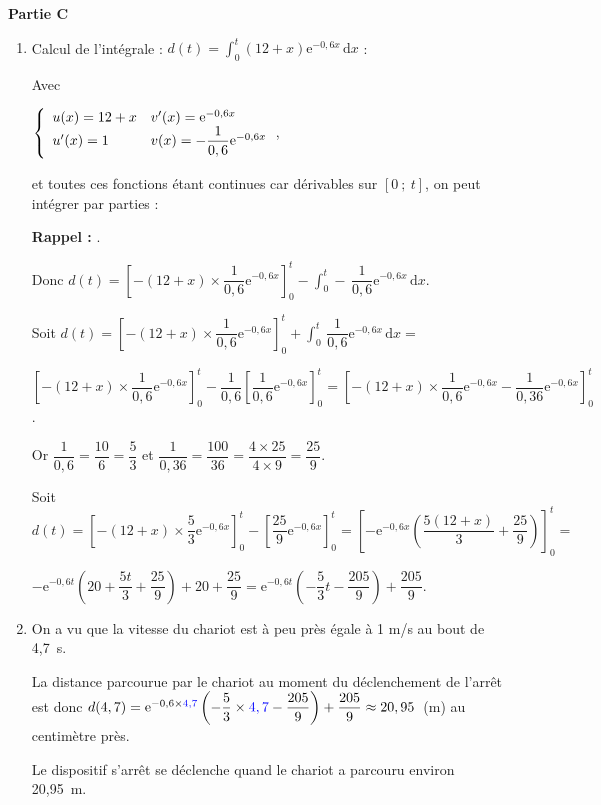 \documentclass[10pt]{article}
\providecommand{\blue}{\color{blue}}
\providecommand{\e}{{\mathrm{e}}}
\providecommand{\blue}{\color{blue}}
\begin{document}
\begin{center}\textbf{Partie C} \end{center}

\begin{enumerate}
\item Calcul de l'intégrale : $d(t) = \displaystyle\int_0^t (12 + x)\e^{-0,6x}\,\text{d}x$ :

Avec

$\left\{\begin{array}{l l}
u(x) = 12 + x	&v'(x) = \e^{-0,6x}\\
u'(x) = 1		&v(x) = - \dfrac{1}{0,6}\e^{-0,6x}\\
\end{array}\right.$,

et toutes ces fonctions étant continues car dérivables sur $[0~;~t]$, on peut intégrer par parties :

\textbf{Rappel :} .

Donc $d(t) = \left[-(12 + x)\times \dfrac{1}{0,6}\e^{-0,6x}\right]_0^t - \displaystyle\int_0^t -\,\dfrac{1}{0,6}\e^{-0,6x}\,\text{d}x$.

Soit $d(t) = \left[-(12 + x)\times \dfrac{1}{0,6}\e^{-0,6x} \right]_0^t + \displaystyle\int_0^t \,\dfrac{1}{0,6}\e^{-0,6x}\,\text{d}x = $

$\left[-(12 + x)\times \dfrac{1}{0,6}\e^{-0,6x} \right]_0^t - \dfrac{1}{0,6}\left[\dfrac{1}{0,6}\e^{-0,6x}\right]_0^t  = \left[-(12 + x)\times \dfrac{1}{0,6}\e^{-0,6x} - \dfrac{1}{0,36}\e^{-0,6x} \right]_0^t$.

Or $\dfrac{1}{0,6} = \dfrac{10}{6} = \dfrac 53$ et $\dfrac{1}{0,36} = \dfrac{100}{36} = \dfrac{4\times 25}{4 \times 9} = \dfrac{25}{9}$.

Soit $d(t) = \left[-(12 + x)\times \dfrac53\e^{-0,6x} \right]_0^t - \left[\dfrac{25}{9}\e^{-0,6x} \right]_0^t = \left[-\e^{-0,6x}\left(\dfrac{5(12 + x)}{3}  + \dfrac{25}{9}\right) \right]_0^t =$

$ -\e^{-0,6t}\left(20 + \dfrac{5t}{3} + \dfrac{25}{9}\right) + 20 + \dfrac{25}{9} = \e^{-0,6t}\left(- \dfrac 53 t - \dfrac{205}{9}\right) + \dfrac{205}{9}$.
\item On a vu que la vitesse du chariot est à peu près égale à 1 m/s au bout de 4,7~s.

La distance parcourue par le chariot au moment du déclenchement de l'arrêt est donc $d(4,7) = \e^{-0,6\times {\blue 4,7}}\left(- \dfrac 53 \times{\blue 4,7} - \dfrac{205}{9}\right) + \dfrac{205}{9} \approx 20,95$~(m) au centimètre près.

Le dispositif s'arrêt se déclenche quand le chariot a parcouru environ 20,95~m.

\end{enumerate}
\end{document}
